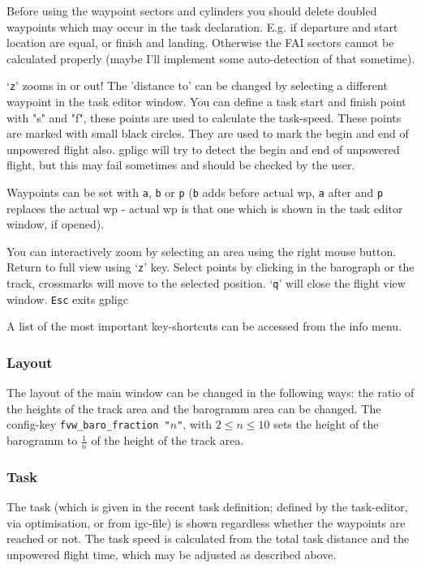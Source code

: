 Before using the waypoint sectors and cylinders you should delete doubled waypoints which may occur in the task declaration. E.g. if departure and start location are equal, or finish and landing.
Otherwise the FAI sectors cannot be calculated properly (maybe I'll implement some auto-detection of that sometime).

`\texttt{z}' zooms in or out!
The 'distance to' can be changed by selecting a different waypoint in the task editor window.
You can define a task start and finish point with "s" and "f", these points are
used to calculate the task-speed. These points are marked with small black circles.
They are used to mark the begin and end of unpowered flight also.
gpligc will try to detect the begin and end of unpowered flight, but this may fail sometimes and should be checked by the user.

Waypoints can be set with \texttt{a}, \texttt{b} or \texttt{p} (\texttt{b} adds before actual wp, \texttt{a} after and \texttt{p}
replaces the actual wp - actual wp is that one which is shown in the task editor window, if opened).

You can interactively zoom by selecting an area using the right mouse button. Return to full view using `\texttt{z}' key.
Select points by clicking in the barograph or the track, crossmarks will move to the selected position.
`\texttt{q}' will close the flight view window.
\texttt{Esc} exits gpligc

A list of the most important key-shortcuts can be accessed from the info menu.

\subsubsection{Layout}
The layout of the main window can be changed in the following ways:
the ratio of the heights of the track area and the barogramm area can be changed.
The config-key \texttt{fvw\_baro\_fraction "$n$"}, with $2 \le n \le 10$ sets the height of the barogramm to $\frac{1}{n}$ of the height of the track area.


\subsubsection{Task}
The task (which is given in the recent task definition; defined by the task-editor, via optimisation, or from igc-file) is shown regardless whether the waypoints are reached or not.
The task speed is calculated from the total task distance and the unpowered flight time, which may be adjusted as described above.

